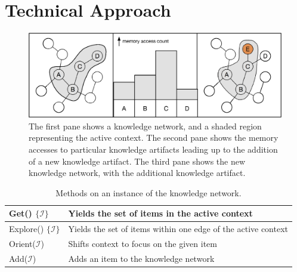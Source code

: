 \documentclass[11pt,letterpaper]{article}
\begin{document}
\section{Technical Approach}

\begin{figure}[h]
\centering
\includegraphics[scale=.5]{sf_add.eps}
\caption{The first pane shows a knowledge network, and a shaded region
  representing the active context. The second pane shows the memory accesses
  to particular knowledge artifacts leading up to the addition of a new
  knowledge artifact. The third pane shows the new knowledge network, with
  the additional knowledge artifact.}
\label{fig:sf_add}
\end{figure}

\begin{table}[h]
  \begin{center}
  \begin{tabular}{|l|p{4in}|}
    \hline
    {\sc Get() $\{\mathcal{I}\}$}     & Yields the set of items in the
      active context \\ \hline
    {\sc Explore() $\{\mathcal{I}\}$} & Yields the set of items within one
      edge of the active context \\ \hline
    {\sc Orient($\mathcal{I}$)}       & Shifts context to focus on the given
      item \\ \hline
    {\sc Add($\mathcal{I}$)}          & Adds an item to the knowledge
      network \\ \hline
  \end{tabular}
  \end{center}
\caption{Methods on an instance of the knowledge network.}
\label{tab:sf_get}
\end{table}
\end{document}
